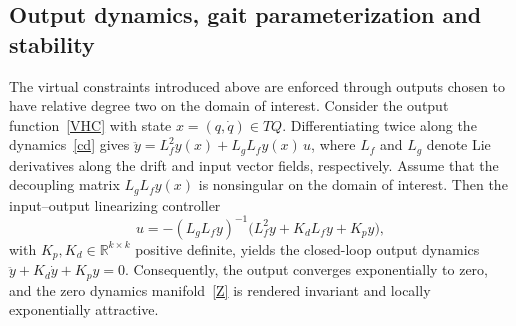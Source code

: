 \documentclass[letterpaper, 10 pt, conference]{ieeeconf}
\newcommand{\ara}[1]{\textcolor{purple}{(ARA: #1)}}
\begin{document}
\subsection{Output dynamics, gait parameterization and stability}

The virtual constraints introduced above are enforced through outputs chosen to have relative degree two on the domain of interest. Consider the output function~\eqref{VHC} with state $x=(q,\dot q)\in TQ$. Differentiating twice along the dynamics~\eqref{cd} gives $\ddot y = L_f^2 y(x) + L_g L_f y(x)\,u$, where $L_f$ and $L_g$ denote Lie derivatives along the drift and input vector fields, respectively. Assume that the decoupling matrix $L_gL_f y(x)$ is nonsingular on the domain of interest. Then the input--output linearizing controller
\[
u=-(L_gL_f y)^{-1}\big(L_f^2 y+K_dL_f y+K_p y\big),
\]
with $K_p,K_d\in\mathbb R^{k\times k}$ positive definite, yields the closed-loop output dynamics $\ddot y + K_d \dot y + K_p y = 0$. Consequently, the output converges exponentially to zero, and the zero dynamics manifold~\eqref{Z} is rendered invariant and locally exponentially attractive.




\end{document}

